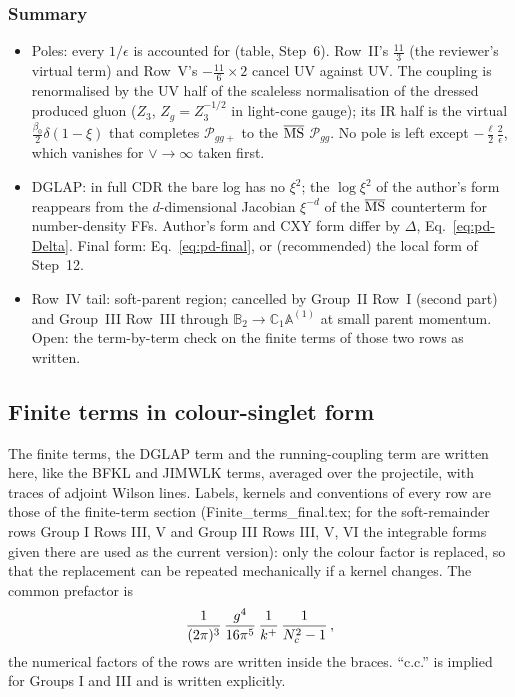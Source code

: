 \documentclass[10pt]{article}
\def\mf#1{\mathbb{#1}}
\begin{document}
\subsubsection{Summary}
\begin{itemize}
\item Poles: every $1/\epsilon$ is accounted for (table, Step~6). Row~II's $\frac{11}{3}$ (the reviewer's virtual term) and Row~V's $-\frac{11}{6}\times2$ cancel UV against UV. The coupling is renormalised by the UV half of the scaleless normalisation of the dressed produced gluon ($Z_{3}$, $Z_{g}=Z_{3}^{-1/2}$ in light-cone gauge); its IR half is the virtual $\frac{\beta_{0}}{2}\delta(1-\xi)$ that completes $\mathcal{P}_{gg+}$ to the $\overline{\rm MS}$ $\mathcal{P}_{gg}$. No pole is left except $-\frac{\ell}{2}\frac{2}{\epsilon}$, which vanishes for $\vee\to\infty$ taken first.
\item DGLAP: in full CDR the bare log has no $\xi^{2}$; the $\log\xi^{2}$ of the author's form reappears from the $d$-dimensional Jacobian $\xi^{-d}$ of the $\overline{\rm MS}$ counterterm for number-density FFs. Author's form and CXY form differ by $\Delta$, Eq.~\eqref{eq:pd-Delta}. Final form: Eq.~\eqref{eq:pd-final}, or (recommended) the local form of Step~12.
\item Row~IV tail: soft-parent region; cancelled by Group~II Row~I (second part) and Group~III Row~III through $\mf{B}_{2}\to\mf{C}_{1}\mf{A}^{(1)}$ at small parent momentum. Open: the term-by-term check on the finite terms of those two rows as written.
\end{itemize}


\subsection{Finite terms in colour-singlet form}\label{sec:singlet}
\noindent The finite terms, the DGLAP term and the running-coupling term are written here, like the BFKL and JIMWLK terms, averaged over the projectile, with traces of adjoint Wilson lines. Labels, kernels and conventions of every row are those of the finite-term section (Finite\_terms\_final.tex; for the soft-remainder rows Group I Rows III, V and Group III Rows III, V, VI the integrable forms given there are used as the current version): only the colour factor is replaced, so that the replacement can be repeated mechanically if a kernel changes. The common prefactor is
\begin{align}
\frac{1}{(2\pi)^{3}}\,\frac{g^{4}}{16\pi^{5}}\,\frac{1}{k^{+}}\,\frac{1}{N_{c}^{2}-1}\,,\notag
\end{align}
the numerical factors of the rows are written inside the braces. ``c.c.'' is implied for Groups I and III and is written explicitly.
\end{document}
